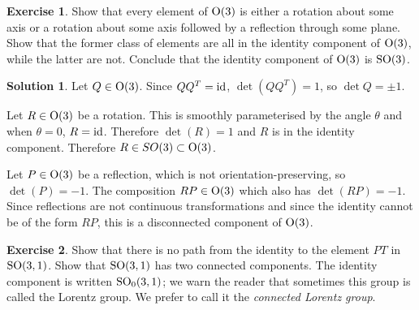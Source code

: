 \documentclass[11pt, a4paper]{report}
\theoremstyle{definition}
\newtheorem{exercise}{Exercise}[part]
\newtheorem{solution}{Solution}[part]
\newenvironment{ex}{\begin{exercise}}{\end{exercise}\pagebreak[1]}
\newenvironment{sol}{\begin{solution}}{\end{solution}\pagebreak[3]}
\renewcommand*{\O}{\ensuremath\text{O}}
\newcommand*{\SO}{\ensuremath\text{SO}}
\newcommand*{\id}{\ensuremath\mathop{}\mathopen{}\mathrm{id}}
\begin{document}
\begin{ex}

Show that every element of $\O(3)$ is either a rotation about some axis or a rotation about some axis followed by a reflection through some plane.
Show that the former class of elements are all in the identity component of $\O(3)$, while the latter are not.
Conclude that the identity component of $\O(3)$ is $\SO(3)$.

\end{ex}

\begin{sol}

Let $Q \in \O(3)$. Since $QQ^T = \id$, $\det(QQ^T) = 1$, so $\det{Q} = \pm 1$.

Let $R \in \O(3)$ be a rotation. This is smoothly parameterised by the angle $\theta$ and when $\theta = 0$, $R = \id$.
Therefore $\det(R) = 1$ and $R$ is in the identity component.
Therefore $R \in SO(3) \subset \O(3)$.

Let $P \in \O(3)$ be a reflection, which is not orientation-preserving, so $\det(P) = -1$.
The composition $RP \in \O(3)$ which also has $\det(RP) = -1$.
Since reflections are not continuous transformations and since the identity cannot be of the form $RP$, this is a disconnected component of $\O(3)$.

\end{sol}

\begin{ex}

Show that there is no path from the identity to the element $PT$ in $\SO(3, 1)$.
Show that $\SO(3, 1)$ has two connected components.
The identity component is written $\SO_0(3, 1)$;
we warn the reader that sometimes this group is called the Lorentz group.
We prefer to call it the \emph{connected Lorentz group}.

\end{ex}
\end{document}
